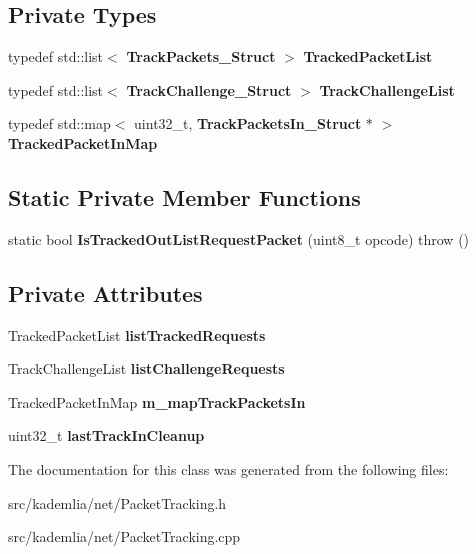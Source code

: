 \subsection*{Private Types}
\begin{DoxyCompactItemize}
\item 
typedef std::list$<$ {\bf TrackPackets\_\-Struct} $>$ {\bfseries TrackedPacketList}\label{classKademlia_1_1CPacketTracking_a451774586dc283ee3fb82d9a9b87eaa3}

\item 
typedef std::list$<$ {\bf TrackChallenge\_\-Struct} $>$ {\bfseries TrackChallengeList}\label{classKademlia_1_1CPacketTracking_aec85237940bb7f950de89c6a16f1cf43}

\item 
typedef std::map$<$ uint32\_\-t, {\bf TrackPacketsIn\_\-Struct} $\ast$ $>$ {\bfseries TrackedPacketInMap}\label{classKademlia_1_1CPacketTracking_a6fc3909ec77bee6d6ada460acda84598}

\end{DoxyCompactItemize}
\subsection*{Static Private Member Functions}
\begin{DoxyCompactItemize}
\item 
static bool {\bfseries IsTrackedOutListRequestPacket} (uint8\_\-t opcode)  throw ()\label{classKademlia_1_1CPacketTracking_a7f4ffae645ebb5a77e0a26b6cf300dbe}

\end{DoxyCompactItemize}
\subsection*{Private Attributes}
\begin{DoxyCompactItemize}
\item 
TrackedPacketList {\bfseries listTrackedRequests}\label{classKademlia_1_1CPacketTracking_a906632373a09c10f3b2fbe052972bf52}

\item 
TrackChallengeList {\bfseries listChallengeRequests}\label{classKademlia_1_1CPacketTracking_a1b4817077e49397a339536702292e881}

\item 
TrackedPacketInMap {\bfseries m\_\-mapTrackPacketsIn}\label{classKademlia_1_1CPacketTracking_a43503a25bcb7b24245db1c5cdfec0b51}

\item 
uint32\_\-t {\bfseries lastTrackInCleanup}\label{classKademlia_1_1CPacketTracking_a8da5e21e59a0e159a441725e1eb5da71}

\end{DoxyCompactItemize}


The documentation for this class was generated from the following files:\begin{DoxyCompactItemize}
\item 
src/kademlia/net/PacketTracking.h\item 
src/kademlia/net/PacketTracking.cpp\end{DoxyCompactItemize}
